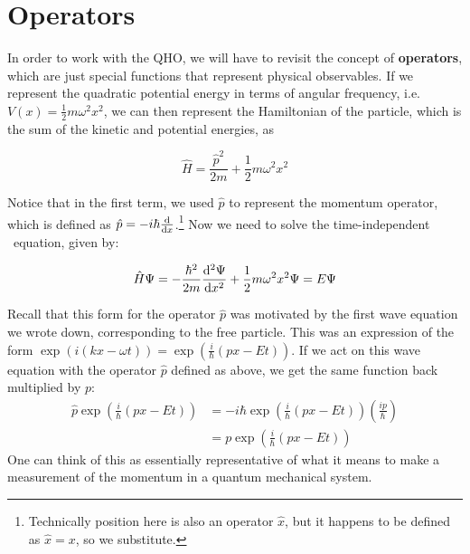 
\section{Operators}
In order to work with the QHO, we will have to revisit the concept of \textbf{operators}, which are just special functions that represent physical observables. If we represent the quadratic potential energy in terms of angular frequency, i.e. $V(x)=\frac{1}{2}m\omega^2x^2$, we can then represent the Hamiltonian of the particle, which is the sum of the kinetic and potential energies, as
\begin{tcolorbox}[title = Hamiltonian for the QHO] \vspace{-2ex}
	\begin{equation}
	\hat{H} = \frac{\hat{p}^2}{2m} + \frac{1}{2}m\omega^2x^2 \label{eq:ham-qho}
	\end{equation}
\end{tcolorbox}

Notice that in the first term, we used $\hat{p}$ to represent the momentum operator, which is defined as $\hat{p}=-i\hbar\dv{x}$.\footnote{Technically position here is also an operator $\hat{x}$, but it happens to be defined as $\hat{x}=x$, so we substitute.} Now we need to solve the time-independent \Sch\ equation, given by:
\begin{tcolorbox}[title = \Sch\ equation for the QHO] \vspace{-2ex}
	\begin{equation}
		\hat{H}\Psi = -\frac{\hbar^2}{2m}\dv[2]{\Psi}{x} + \frac{1}{2}m\omega^2x^2\Psi = E\Psi \label{eq:se-qho}
	\end{equation}
\end{tcolorbox}

Recall that this form for the operator $\hat{p}$ was motivated by the first wave equation we wrote down, corresponding to the free particle. This was an expression of the form $\exp\left(i(kx-\omega t)\right) = \exp \left( \frac{i}{\hbar}(px-Et) \right)$. If we act on this wave equation with the operator $\hat{p}$ defined as above, we get the same function back multiplied by $p$:
\begin{align*}
	\hat{p}\exp \left(\frac{i}{\hbar}(px-Et)\right) &= -i\hbar\exp \left(\frac{i}{\hbar}(px-Et)\right) \left(\frac{ip}{\hbar}\right) \\
	&= p\exp \left(\frac{i}{\hbar}(px-Et)\right)
\end{align*}
One can think of this as essentially representative of what it means to make a measurement of the momentum in a quantum mechanical system. \par 

